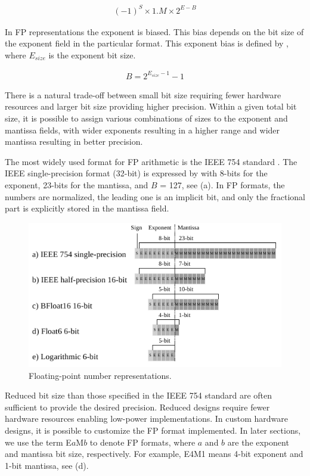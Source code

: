 \begin{eqnarray} \label{eq:float}
(-1)^{S} \times 1.M \times 2^{E-B}
\end{eqnarray}

In FP representations the exponent is biased. This bias depends on the bit size of the exponent field in the particular format. This exponent bias is defined by , where $E_{size}$ is the exponent bit size.

\begin{eqnarray} \label{eq:float_bias}
B=2^{E_{size}-1}-1
\end{eqnarray}

There is a natural trade-off between small bit size requiring fewer hardware resources and larger bit size providing higher precision. Within a given total bit size, it is possible to assign various combinations of sizes to the exponent and mantissa fields, with wider exponents resulting in a higher range and wider mantissa resulting in better precision.

The most widely used format for FP arithmetic is the IEEE 754 standard \cite{zuras2008ieee}. The IEEE single-precision format (32-bit) is expressed by  with 8-bits for the exponent, 23-bits for the mantissa, and $B$ = 127, see (a). In FP formats, the numbers are normalized, the leading one is an implicit bit, and only the fractional part is explicitly stored in the mantissa field.

\begin{figure}[h!]
	\centering
	\includegraphics[width=1\columnwidth]{../figures/power_breakdown/floating_point.pdf}
	\caption{Floating-point number representations.}
	\label{fig:floating}
\end{figure}

Reduced bit size than those specified in the IEEE 754 standard are often sufficient to provide the desired precision. Reduced designs require fewer hardware resources enabling low-power implementations. In custom hardware designs, it is possible to customize the FP format implemented. In later sections, we use the term E$a$M$b$ to denote FP formats, where $a$ and $b$ are the exponent and mantissa bit size, respectively. For example, E4M1 means 4-bit exponent and 1-bit mantissa, see (d).

